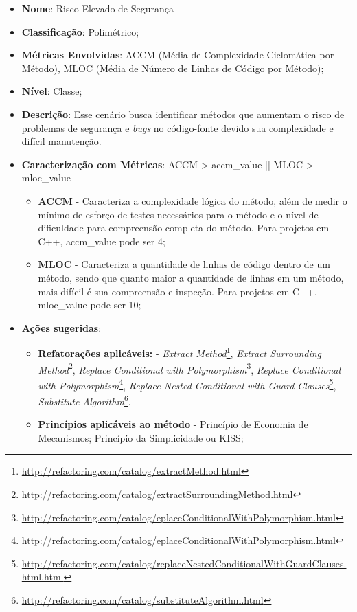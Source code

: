 \begin{itemize}
\item \textbf{Nome}: Risco Elevado de Segurança
\item \textbf{Classificação}: Polimétrico;
\item \textbf{Métricas Envolvidas}: ACCM (Média de Complexidade Ciclomática por Método), MLOC (Média de Número de Linhas de Código por Método);
\item \textbf{Nível}: Classe;
\item \textbf{Descrição}: Esse cenário busca identificar métodos que aumentam o risco de problemas de segurança e \emph{bugs} no código-fonte devido sua complexidade e difícil manutenção.
\item \textbf{Caracterização com Métricas}: ACCM > accm\_value || MLOC > mloc\_value
	\begin{itemize}
	\item \textbf{ACCM} - Caracteriza a complexidade lógica do método, além de medir o mínimo de esforço de testes necessários para o método e o nível de dificuldade para compreensão completa do método. Para projetos em C++, accm\_value pode ser 4;
	\item \textbf{MLOC} - Caracteriza a quantidade de linhas de código dentro de um método, sendo que quanto maior a quantidade de linhas em um método, mais difícil é sua compreensão e inspeção. Para projetos em C++, mloc\_value pode ser 10;
	\end{itemize}
\item \textbf{Ações sugeridas}:
	\begin{itemize}
	\item \textbf{Refatorações aplicáveis:} - \emph{Extract Method}\footnote{\url{http://refactoring.com/catalog/extractMethod.html}},  \emph{Extract Surrounding Method}\footnote{\url{http://refactoring.com/catalog/extractSurroundingMethod.html}}, \emph{Replace Conditional with Polymorphism}\footnote{\url{http://refactoring.com/catalog/eplaceConditionalWithPolymorphism.html}}, \emph{Replace Conditional with Polymorphism}\footnote{\url{http://refactoring.com/catalog/eplaceConditionalWithPolymorphism.html}}, \emph{Replace Nested Conditional with Guard Clauses}\footnote{\url{http://refactoring.com/catalog/replaceNestedConditionalWithGuardClauses.html.html}}, \emph{Substitute Algorithm}\footnote{\url{http://refactoring.com/catalog/substituteAlgorithm.html}}.
	\item \textbf{Princípios aplicáveis ao método} - Princípio de Economia de Mecanismos; Princípio da Simplicidade ou KISS;
	\end{itemize}
\end{itemize}


